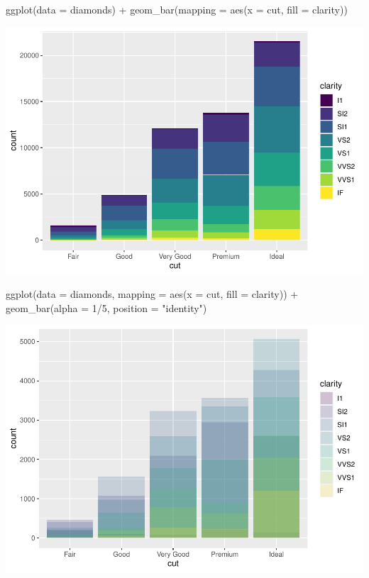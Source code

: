 \documentclass[
]{article}
\newenvironment{Shaded}{\begin{snugshade}}{\end{snugshade}}
\newcommand{\AttributeTok}[1]{\textcolor[rgb]{0.77,0.63,0.00}{#1}}
\newcommand{\DecValTok}[1]{\textcolor[rgb]{0.00,0.00,0.81}{#1}}
\newcommand{\FunctionTok}[1]{\textcolor[rgb]{0.00,0.00,0.00}{#1}}
\newcommand{\NormalTok}[1]{#1}
\newcommand{\SpecialCharTok}[1]{\textcolor[rgb]{0.00,0.00,0.00}{#1}}
\newcommand{\StringTok}[1]{\textcolor[rgb]{0.31,0.60,0.02}{#1}}
\begin{document}
\begin{Shaded}
\begin{Highlighting}[]
\FunctionTok{ggplot}\NormalTok{(}\AttributeTok{data =}\NormalTok{ diamonds) }\SpecialCharTok{+} 
  \FunctionTok{geom\_bar}\NormalTok{(}\AttributeTok{mapping =} \FunctionTok{aes}\NormalTok{(}\AttributeTok{x =}\NormalTok{ cut, }\AttributeTok{fill =}\NormalTok{ clarity))}
\end{Highlighting}
\end{Shaded}

\includegraphics{Journal_files/figure-latex/unnamed-chunk-54-3.pdf}

\begin{Shaded}
\begin{Highlighting}[]
\FunctionTok{ggplot}\NormalTok{(}\AttributeTok{data =}\NormalTok{ diamonds, }\AttributeTok{mapping =} \FunctionTok{aes}\NormalTok{(}\AttributeTok{x =}\NormalTok{ cut, }\AttributeTok{fill =}\NormalTok{ clarity)) }\SpecialCharTok{+} 
  \FunctionTok{geom\_bar}\NormalTok{(}\AttributeTok{alpha =} \DecValTok{1}\SpecialCharTok{/}\DecValTok{5}\NormalTok{, }\AttributeTok{position =} \StringTok{"identity"}\NormalTok{)}
\end{Highlighting}
\end{Shaded}

\includegraphics{Journal_files/figure-latex/unnamed-chunk-54-4.pdf}
\end{document}
